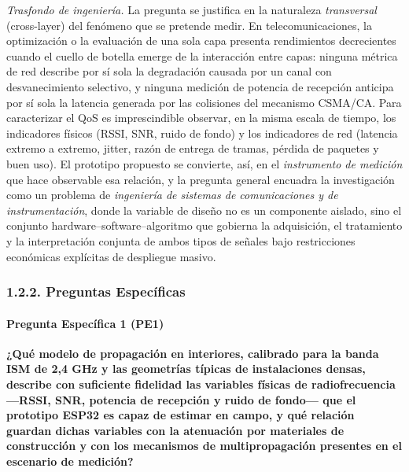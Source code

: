 \documentclass[
  12pt,
]{article}
\begin{document}
\emph{Trasfondo de ingeniería.} La pregunta se justifica en la
naturaleza \emph{transversal} (cross-layer) del fenómeno que se pretende
medir. En telecomunicaciones, la optimización o la evaluación de una
sola capa presenta rendimientos decrecientes cuando el cuello de botella
emerge de la interacción entre capas: ninguna métrica de red describe
por sí sola la degradación causada por un canal con desvanecimiento
selectivo, y ninguna medición de potencia de recepción anticipa por sí
sola la latencia generada por las colisiones del mecanismo CSMA/CA. Para
caracterizar el QoS es imprescindible observar, en la misma escala de
tiempo, los indicadores físicos (RSSI, SNR, ruido de fondo) y los
indicadores de red (latencia extremo a extremo, jitter, razón de entrega
de tramas, pérdida de paquetes y buen uso). El prototipo propuesto se
convierte, así, en el \emph{instrumento de medición} que hace observable
esa relación, y la pregunta general encuadra la investigación como un
problema de \emph{ingeniería de sistemas de comunicaciones y de
instrumentación}, donde la variable de diseño no es un componente
aislado, sino el conjunto hardware–software–algoritmo que gobierna la
adquisición, el tratamiento y la interpretación conjunta de ambos tipos
de señales bajo restricciones económicas explícitas de despliegue
masivo.

\subsubsection{1.2.2. Preguntas
Específicas}\label{preguntas-especuxedficas}

\paragraph{Pregunta Específica 1
(PE1)}\label{pregunta-especuxedfica-1-pe1}

\textbf{¿Qué modelo de propagación en interiores, calibrado para la
banda ISM de 2,4 GHz y las geometrías típicas de instalaciones densas,
describe con suficiente fidelidad las variables físicas de
radiofrecuencia —RSSI, SNR, potencia de recepción y ruido de fondo— que
el prototipo ESP32 es capaz de estimar en campo, y qué relación guardan
dichas variables con la atenuación por materiales de construcción y con
los mecanismos de multipropagación presentes en el escenario de
medición?}
\end{document}
